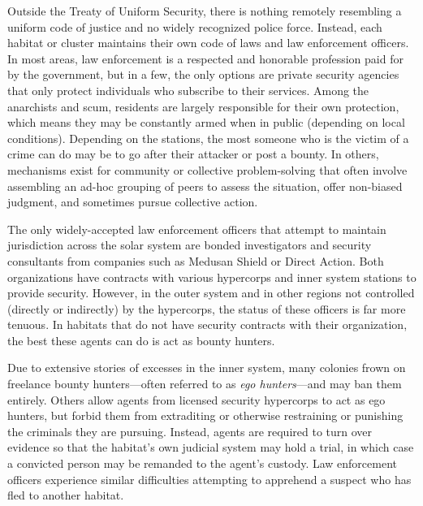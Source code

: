 Outside the Treaty of Uniform Security, there is 
nothing remotely resembling a uniform code of justice
and no widely recognized police force. Instead,
each habitat or cluster maintains their own code of 
laws and law enforcement officers. In most areas, law 
enforcement is a respected and honorable profession 
paid for by the government, but in a few, the only 
options are private security agencies that only protect 
individuals who subscribe to their services. Among 
the anarchists and scum, residents are largely responsible
for their own protection, which means they
may be constantly armed when in public (depending 
on local conditions). Depending on the stations, the 
most someone who is the victim of a crime can do 
may be to go after their attacker or post a bounty. 
In others, mechanisms exist for community or collective
problem-solving that often involve assembling an
ad-hoc grouping of peers to assess the situation, offer 
non-biased judgment, and sometimes pursue collective
action.

The only widely-accepted law enforcement officers
that attempt to maintain jurisdiction across the
solar system are bonded investigators and security 
consultants from companies such as Medusan Shield 
or Direct Action. Both organizations have contracts 
with various hypercorps and inner system stations to 
provide security. However, in the outer system and in 
other regions not controlled (directly or indirectly) by 
the hypercorps, the status of these officers is far more 
tenuous. In habitats that do not have security contracts
with their organization, the best these agents
can do is act as bounty hunters.

Due to extensive stories of excesses in the inner 
system, many colonies frown on freelance bounty 
hunters—often referred to as \textit{ego hunters}—and may 
ban them entirely. Others allow agents from licensed 
security hypercorps to act as ego hunters, but forbid 
them from extraditing or otherwise restraining or 
punishing the criminals they are pursuing. Instead, 
agents are required to turn over evidence so that the 
habitat's own judicial system may hold a trial, in 
which case a convicted person may be remanded to 
the agent's custody. Law enforcement officers experience
similar difficulties attempting to apprehend a
suspect who has fled to another habitat.

